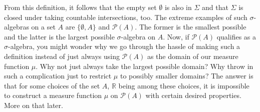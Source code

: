 \medskip
From this definition, it follows that the empty set $\emptyset$ is also in $\Sigma$ and that $\Sigma$ is closed under taking countable intersections, too. The extreme examples of such $\sigma$-algebras on a set $A$ are $\{\emptyset, A\}$ and $\mathcal{P}(A)$. The former is the smallest possible and the latter is the largest possible $\sigma$-algebra on $A$. Now, if $\mathcal{P}(A)$ qualifies as a $\sigma$-algebra, you might wonder why we go through the hassle of making such a definition instead of just always using $\mathcal{P}(A)$ as the domain of our measure function $\mu$. Why not just always take the largest possible domain? Why throw in such a complication just to restrict $\mu$ to possibly smaller domains? The answer is that for some choices of the set $A$, $\mathbb{R}$ being among these choices, it is impossible to construct a measure function $\mu$ on $\mathcal{P}(A)$ with certain desired properties. More on that later.









